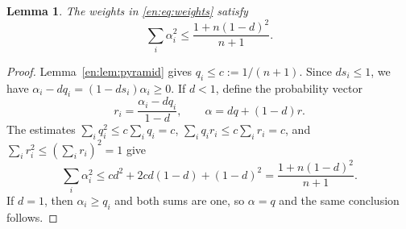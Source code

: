\documentclass[12pt]{amsart}
\newtheorem{lem}[thm]{Lemma}
\theoremstyle{definition}
\theoremstyle{remark}
\numberwithin{equation}{section}
\theoremstyle{plain}
\theoremstyle{definition}
\theoremstyle{remark}
\begin{document}
\begin{lem}\label{en:lem:probability}
The weights in \eqref{en:eq:weights} satisfy
\begin{equation}\label{en:eq:sum-squares}
 \sum_i\alpha_i^2\le\frac{1+n(1-d)^2}{n+1}.
\end{equation}
\end{lem}
\begin{proof}
Lemma~\ref{en:lem:pyramid} gives $q_i\le c:=1/(n+1)$.
Since $ds_i\le1$, we have $\alpha_i-dq_i=(1-ds_i)\alpha_i\ge0$.
If $d<1$, define the probability vector
\begin{equation}\label{en:eq:mixture}
 r_i=\frac{\alpha_i-dq_i}{1-d},\qquad
 \alpha=dq+(1-d)r.
\end{equation}
The estimates
$\sum_iq_i^2\le c\sum_iq_i=c$,
$\sum_iq_ir_i\le c\sum_ir_i=c$, and
$\sum_ir_i^2\le(\sum_ir_i)^2=1$ give
\[
 \sum_i\alpha_i^2
 \le c d^2+2c d(1-d)+(1-d)^2
 =\frac{1+n(1-d)^2}{n+1}.
\]
If $d=1$, then $\alpha_i\ge q_i$ and both sums are one, so $\alpha=q$ and the same conclusion follows.
\end{proof}
\end{document}
